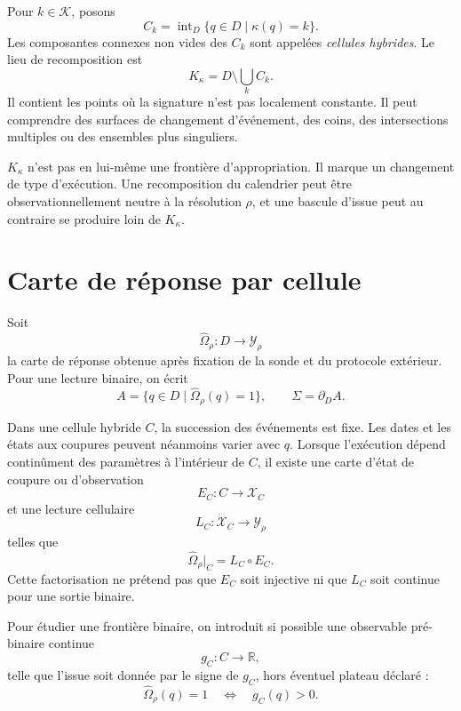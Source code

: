 Pour $k\in\mathcal K$, posons
\[
C_k=\operatorname{int}_D\{q\in D\mid \kappa(q)=k\}.
\]
Les composantes connexes non vides des $C_k$ sont appelées
\emph{cellules hybrides}. Le lieu de recomposition est
\begin{equation}
\label{eq:annexe-J-K}
K_\kappa
=
D\setminus\bigcup_k C_k.
\end{equation}
Il contient les points où la signature n'est pas localement constante.
Il peut comprendre des surfaces de changement d'événement, des coins,
des intersections multiples ou des ensembles plus singuliers.

\begin{encadre}[title={Précaution de portée}]
$K_\kappa$ n'est pas en lui-même une frontière d'appropriation. Il marque
un changement de type d'exécution. Une recomposition du calendrier peut
être observationnellement neutre à la résolution $\rho$, et une bascule
d'issue peut au contraire se produire loin de $K_\kappa$.
\end{encadre}

\section{Carte de réponse par cellule}
\label{annexe-J-reponse-cellule}

Soit
\[
\widehat\Omega_{\rho}:D\longrightarrow\mathcal Y_\rho
\]
la carte de réponse obtenue après fixation de la sonde et du protocole
extérieur. Pour une lecture binaire, on écrit
\[
A=\{q\in D\mid \widehat\Omega_\rho(q)=1\},
\qquad
\Sigma=\partial_D A.
\]

Dans une cellule hybride $C$, la succession des événements est fixe.
Les dates et les états aux coupures peuvent néanmoins varier avec $q$.
Lorsque l'exécution dépend continûment des paramètres à l'intérieur de
$C$, il existe une carte d'état de coupure ou d'observation
\[
E_C:C\longrightarrow \mathcal X_C
\]
et une lecture cellulaire
\[
L_C:\mathcal X_C\longrightarrow\mathcal Y_\rho
\]
telles que
\begin{equation}
\label{eq:annexe-J-factorisation-cellule}
\widehat\Omega_\rho|_C=L_C\circ E_C.
\end{equation}
Cette factorisation ne prétend pas que $E_C$ soit injective ni que
$L_C$ soit continue pour une sortie binaire.

Pour étudier une frontière binaire, on introduit si possible une
observable pré-binaire continue
\[
g_C:C\longrightarrow\mathbb R,
\]
telle que l'issue soit donnée par le signe de $g_C$, hors éventuel
plateau déclaré :
\[
\widehat\Omega_\rho(q)=1
\quad\Longleftrightarrow\quad
g_C(q)>0.
\]

